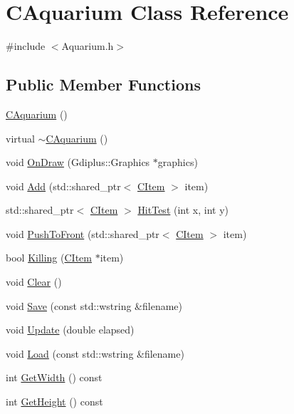 \hypertarget{class_c_aquarium}{}\section{C\+Aquarium Class Reference}
\label{class_c_aquarium}


{\ttfamily \#include $<$Aquarium.\+h$>$}

\subsection*{Public Member Functions}
\begin{DoxyCompactItemize}
\item 
\mbox{\hyperlink{class_c_aquarium_ab6ba8b1abd87437ff66748e82173a5a8}{C\+Aquarium}} ()
\item 
virtual \mbox{\hyperlink{class_c_aquarium_ab1baf78dc047af2b8cab8982e1446875}{$\sim$\+C\+Aquarium}} ()
\item 
void \mbox{\hyperlink{class_c_aquarium_a20b4899158d1ba4bc41217630d47e180}{On\+Draw}} (Gdiplus\+::\+Graphics $\ast$graphics)
\item 
void \mbox{\hyperlink{class_c_aquarium_a85063d05c147cf80f54182016fe12d64}{Add}} (std\+::shared\+\_\+ptr$<$ \mbox{\hyperlink{class_c_item}{C\+Item}} $>$ item)
\item 
std\+::shared\+\_\+ptr$<$ \mbox{\hyperlink{class_c_item}{C\+Item}} $>$ \mbox{\hyperlink{class_c_aquarium_a7129486467e76938fbc049723f9187f3}{Hit\+Test}} (int x, int y)
\item 
void \mbox{\hyperlink{class_c_aquarium_a2ee2a7d57d9f5d9996f9f9b468c98a2b}{Push\+To\+Front}} (std\+::shared\+\_\+ptr$<$ \mbox{\hyperlink{class_c_item}{C\+Item}} $>$ item)
\item 
bool \mbox{\hyperlink{class_c_aquarium_a111b3c61aa0cd3f8bdda1e2bc6b63ed1}{Killing}} (\mbox{\hyperlink{class_c_item}{C\+Item}} $\ast$item)
\item 
void \mbox{\hyperlink{class_c_aquarium_adc9e22446b161ec23acdef368cb8ac2e}{Clear}} ()
\item 
void \mbox{\hyperlink{class_c_aquarium_acace2b3a8c1ed29011d83ac8231c66d0}{Save}} (const std\+::wstring \&filename)
\item 
void \mbox{\hyperlink{class_c_aquarium_aeffc772356405adc8b79beba77c25d0f}{Update}} (double elapsed)
\item 
void \mbox{\hyperlink{class_c_aquarium_a21faac4da17cea923d8f7a5cebe45141}{Load}} (const std\+::wstring \&filename)
\item 
int \mbox{\hyperlink{class_c_aquarium_a002b101c76d468db423da85b9eb56210}{Get\+Width}} () const
\item 
int \mbox{\hyperlink{class_c_aquarium_a6553dfa3238a4e731dbdbe0ccd6ce956}{Get\+Height}} () const
\end{DoxyCompactItemize}


